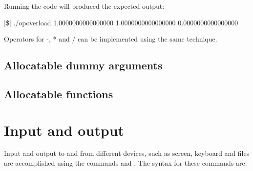 Running the code will produced the expected output:

\cmdmode

\begin{fortrancodeenv}
|\$| ./opoverload 
   1.0000000000000000        1.0000000000000000        0.0000000000000000    
\end{fortrancodeenv}

\fmode

Operators for -, * and / can be implemented using the same technique.

\subsection{Allocatable dummy arguments}


\subsection{Allocatable functions}



%
%
%

\section{Input and output}

Input and output to and from different devices, such as screen, keyboard and files are accomplished using the commands  and . The syntax for these commands are:

